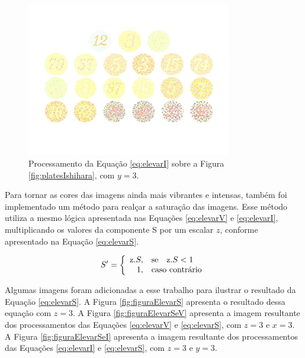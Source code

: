 \documentclass[	12pt, Times, openright, twoside, a4paper, english, brazil]{abntex2}
\begin{document}
\begin{figure}[!htb]
\centering \includegraphics[width=0.80\textwidth]{figuraElevarI.jpg}
\caption{Processamento da Equação \ref{eq:elevarI} sobre a Figura \ref{fig:platesIshihara}, com $y = 3$. \label{fig:figuraElevarI}}
\end{figure}

Para tornar as cores das imagens ainda mais vibrantes e intensas, também foi implementado um método para realçar a saturação das imagens. Esse método utiliza a mesmo lógica apresentada nas Equações \ref{eq:elevarV} e \ref{eq:elevarI}, multiplicando os valores da componente S por um escalar $z$, conforme apresentado na Equação \ref{eq:elevarS}.

\begin{equation}
\label{eq:elevarS}
S'=\left\{
\begin{array}{rl}
       $z$ . S,&\mbox{se}\quad $z$ . S < 1 \\
       1,&\mbox{caso contrário}
\end{array}\right.
\end{equation}

Algumas imagens foram adicionadas a esse trabalho para ilustrar o resultado da Equação \ref{eq:elevarS}. A Figura \ref{fig:figuraElevarS} apresenta o resultado dessa equação com $z=3$. A Figura \ref{fig:figuraElevarSeV} apresenta a imagem resultante dos processamentos das Equações \ref{eq:elevarV} e \ref{eq:elevarS}, com $z = 3$ e $x = 3$. A Figura \ref{fig:figuraElevarSeI} apresenta a imagem resultante dos processamentos das Equações \ref{eq:elevarI} e \ref{eq:elevarS}, com $z = 3$ e $y = 3$.
\end{document}

